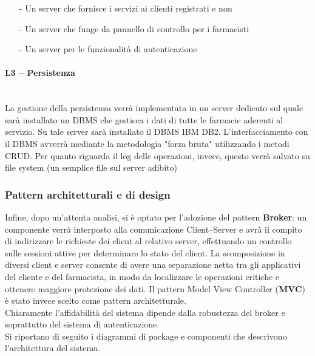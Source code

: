 \begin{itemize}
\item[-] Un server che fornisce i servizi ai clienti registrati e non
\item[-] Un server che funge da pannello di controllo per i farmacisti
\item[-] Un server per le funzionalità di autenticazione
\end{itemize}

\paragraph{L3 -- Persistenza}\mbox{}\\
La gestione della persistenza verrà implementata in un server dedicato sul quale sarà installato un DBMS che gestisca i dati di tutte le farmacie aderenti al servizio.
Su tale server sarà installato il DBMS IBM DB2.
L'interfacciamento con il DBMS avverrà mediante la metodologia "forza bruta" utilizzando i metodi CRUD.
Per quanto riguarda il log delle operazioni, invece, questo verrà salvato su file system (un semplice file sul server adibito)

\subsubsection{Pattern architetturali e di design}

Infine, dopo un'attenta analisi, si è optato per l'adozione del pattern \textbf{Broker}: 
un componente verrà interposto alla comunicazione Client--Server e avrà il compito di indirizzare le richieste dei client al relativo server, 
effettuando un controllo sulle sessioni attive per determinare lo stato del client. 
La scomposizione in diversi client e server consente di avere una separazione netta tra gli applicativi del cliente e del farmacista, 
in modo da localizzare le operazioni critiche e ottenere maggiore protezione dei dati.
Il pattern Model View Controller (\textbf{MVC}) è stato invece scelto come pattern architetturale.
\\
Chiaramente l'affidabilità del sistema dipende dalla robustezza del broker e soprattutto del sistema di autenticazione.
\\
Si riportano di seguito i diagrammi di package e componenti che descrivono l'architettura del sistema.

\newpage

